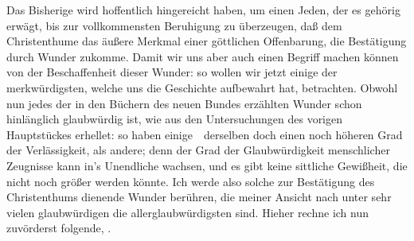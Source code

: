 Das Bisherige wird hoffentlich hingereicht haben, um einen Jeden, der es gehörig erwägt, bis zur vollkommensten Beruhigung zu überzeugen, daß dem Christenthume das äußere Merkmal einer göttlichen Offenbarung, die Bestätigung durch Wunder zukomme. Damit wir uns aber auch einen Begriff machen können von der Beschaffenheit dieser Wunder: so wollen wir jetzt einige der merkwürdigsten, welche uns die Geschichte aufbewahrt hat,  betrachten. Obwohl nun jedes der in den Büchern des neuen Bundes erzählten Wunder schon hinlänglich glaubwürdig ist, wie aus den Untersuchungen des vorigen Hauptstückes erhellet: so haben einige~\ derselben doch einen noch höheren Grad der Verlässigkeit, als andere; denn der Grad der Glaubwürdigkeit menschlicher Zeugnisse kann in's Unendliche wachsen, und es gibt keine sittliche Gewißheit, die nicht noch größer werden könnte. Ich werde also solche zur Bestätigung des Christenthums dienende Wunder berühren, die meiner Ansicht nach unter sehr vielen glaubwürdigen die allerglaubwürdigsten sind. Hieher rechne ich nun zuvörderst folgende, .
